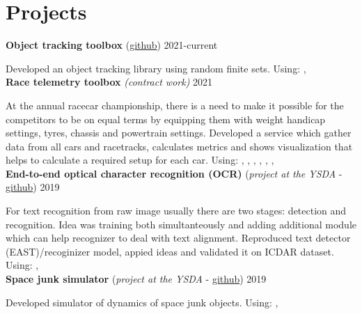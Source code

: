 \section*{\sectionformat Projects}
\textbf{Object tracking toolbox} (\href{https://github.com/neer201/Multi-Object-Tracking-for-Automotive-Systems-in-python}{github}) \hfill 2021-current
\par
Developed an object tracking library using random finite sets.
Using: , 
\\
% 
\textbf{Race telemetry toolbox} \textit{(contract work)} \hfill 2021
\par
At the annual racecar championship, there is a need to make it possible for the competitors to be on equal terms by equipping them with weight handicap settings, tyres, chassis and powertrain settings.
Developed a service which gather data from all cars and racetracks, calculates metrics and shows visualization that helps to calculate a required setup for each car.
Using: , , , , , , 
\\
\textbf{End-to-end optical character recognition (OCR)} (\textit{project at the YSDA} - \href{https://github.com/neer201/end2end_OCR}{github})  \hfill 2019
\par
For text recognition from raw image usually there are two stages: detection and recognition. Idea was training both simultanteously and adding additional module which can help recognizer to deal with text alignment.
Reproduced text detector (EAST)/recoginizer model, appied ideas and validated it on ICDAR dataset.
Using: , 
% 
\\
\textbf{Space junk simulator} (\textit{project at the YSDA} - \href{https://github.com/neer201/space_junk_simulator}{github})   \hfill 2019
\par
Developed simulator of dynamics of space junk objects.
Using: , 

